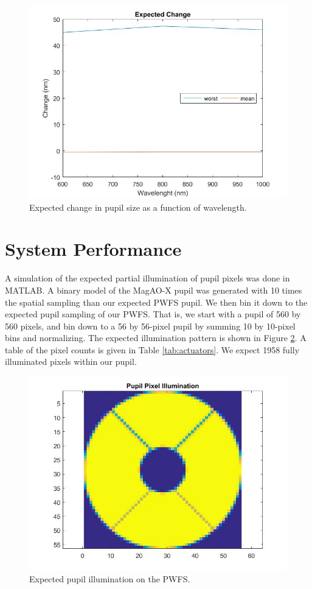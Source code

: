 	
\begin{figure}[h]
	\centering
	\includegraphics[width=.5\textwidth]{Chapter Materials/Chapter Three Materials/achromaticchangegraph.jpg}
	\caption{Expected change in pupil size as a function of wavelength.}
	\label{fig:change}
\end{figure}
	
\section{System Performance}
	
A simulation of the expected partial illumination of pupil pixels was done in MATLAB. A binary model of the MagAO-X pupil was generated with 10 times the spatial sampling than our expected PWFS pupil. We then bin it down to the expected pupil sampling of our PWFS. That is, we start with a pupil of 560 by 560 pixels, and bin down to a 56 by 56-pixel pupil by summing 10 by 10-pixel bins and normalizing. The expected illumination pattern is shown in Figure \ref{fig: pupilpixels}. A table of the pixel counts is given in Table \ref{tab:actuators}. We expect 1958 fully illuminated pixels within our pupil. 
	
	
\begin{figure}%
	\centering
	\includegraphics[width=.4\textwidth]{Chapter Materials/Chapter Three Materials/pupilpixels.jpg}
	\caption{Expected pupil illumination on the PWFS.}	
	\label{fig: pupilpixels}
\end{figure}
	
	
	
